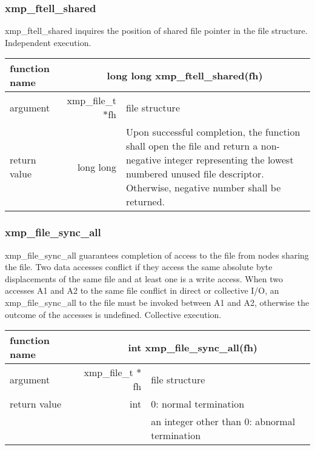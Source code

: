    \subsubsection{xmp\_ftell\_shared}
   xmp\_ftell\_shared inquires the position of shared file pointer in the file structure. Independent execution.

   \clearpage
   \begin{table}[h]
    \begin{center}
     \begin{tabular}{|l|r|p{80mm}|}
      \hline
      {\bf function name}  & \multicolumn{2}{c|}{\bf long long
      xmp\_ftell\_shared(fh)} \\ \hline \hline
      argument & xmp\_file\_t $*$fh & file structure \\ \hline
      return value & long long & Upon successful completion, the
	      function shall open the file and return a non-negative
	      integer representing the lowest numbered unused file
	      descriptor. Otherwise, negative number shall be
	      returned. \\ \hline
      \end{tabular}
     \end{center}
    \label{tb:aaa}
   \end{table}

   \subsubsection{xmp\_file\_sync\_all}
   xmp\_file\_sync\_all guarantees completion of access to the file from nodes sharing the file.
   Two data accesses conflict if they access the same absolute byte displacements of the same file and at least one is a write access.
   When two accesses A1 and A2 to the same file conflict in direct or collective I/O, an xmp\_file\_sync\_all to the file must be invoked between A1 and A2, otherwise the outcome of the accesses is undefined.   
   Collective execution.

   \begin{table}[h]
    \begin{center}
     \begin{tabular}{|l|r|p{80mm}|}
      \hline
      {\bf function name}  & \multicolumn{2}{c|}{\bf int
      xmp\_file\_sync\_all(fh)} \\ \hline \hline
      argument & xmp\_file\_t $*$fh & file structure \\ \hline
      return value & int & 0: normal termination \\
      &  & an integer other than 0: abnormal termination \\ \hline
      \end{tabular}
     \end{center}
    \label{tb:aaa}
   \end{table}

